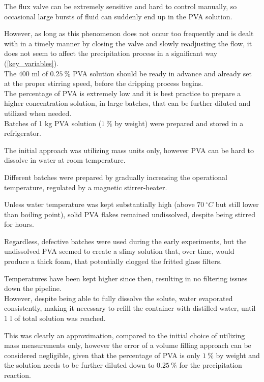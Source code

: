 \documentclass{article}
\begin{document}
        The flux valve can be extremely sensitive and hard to control manually, so occasional large bursts of fluid can suddenly 
        end up in the PVA solution. 

        However, as long as this phenomenon does not occur too frequently and is dealt with in a timely manner by closing the valve and slowly 
        readjusting the flow, it does not seem to affect the precipitation process in a significant way (\ref{key_variables}). \\ 

        The 400 ml of $0.25 \ \%$ PVA solution should be ready in advance and already set at the proper stirring speed, before 
        the dripping process begins. \\ 

        The percentage of PVA is extremely low and it is best practice to prepare a higher concentration solution, in large batches,  
        that can be further diluted and utilized when needed. \\

        Batches of 1 kg PVA solution ($1 \ \%$ by weight) were prepared and stored in a refrigerator. 

        The initial approach was utilizing mass units only, however PVA can be hard to dissolve in water at room temperature. 
        
        Different batches were prepared by gradually increasing the operational temperature, regulated by a magnetic stirrer-heater. 

        Unless water temperature was kept substantially high (above $70 \ ^{\circ}C $ but still lower than boiling point), 
        solid PVA flakes remained undissolved, despite being stirred for hours. 

        Regardless, defective batches were used during the early experiments, but the undissolved PVA 
        seemed to create a slimy solution that, over time, would produce a thick foam, that potentially clogged 
        the fritted glass filters. 

        Temperatures have been kept higher since then, resulting in no filtering issues down the pipeline. \\ 

        However, despite being able to fully dissolve the solute, water evaporated consistently, making it necessary to refill the 
        container with distilled water, until 1 l of total solution was reached. 

        This was clearly an approximation, compared to the initial choice of utilizing mass measurements only, however 
        the error of a volume filling approach can be considered negligible, given that the 
        percentage of PVA is only $1 \ \%$ by weight and the solution needs to be further diluted down to $0.25 \ \%$ for 
        the precipitation reaction. \\ 
\end{document}
